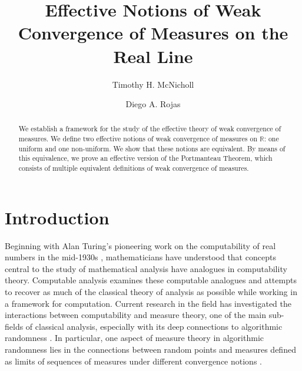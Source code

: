 \documentclass{amsart}
\newcommand{\R}{\mathbb{R}}
\theoremstyle{definition}
\numberwithin{equation}{section}
\begin{document}
\title{Effective Notions of Weak Convergence of Measures on the Real Line}
\author{Timothy H. McNicholl}
\address{Department of Mathematics\\
Iowa State University\\
Ames, Iowa 50011}
\author{Diego A. Rojas}%
\address{Department of Mathematics\\
Iowa State University\\
Ames, Iowa 50011}

\begin{abstract}
We establish a framework for the study of the effective theory of weak convergence of measures.  
We define two effective notions of weak convergence of measures on $\R$: one uniform and one non-uniform. 
We show that these notions are equivalent.   By means of this equivalence, we prove an effective version of the Portmanteau Theorem, which consists of multiple equivalent definitions of weak convergence of measures.
\end{abstract}

\maketitle

\section{Introduction}\label{sec:intro}

Beginning with Alan Turing's pioneering work on the computability of real numbers in the mid-1930s \cite{T37}, mathematicians have understood that concepts central to the study of mathematical analysis have analogues in computability theory. 
Computable analysis examines these computable analogues and attempts to recover as much of the classical theory of analysis as possible while working in a framework for computation. 
Current research in the field has investigated the interactions between computability and measure theory, one of the main sub-fields of classical analysis, especially with its deep connections to algorithmic randomness \cite{R16, R18}. 
In particular, one aspect of measure theory in algorithmic randomness lies in the connections between random points and measures defined as limits of sequences of measures under different convergence notions \cite{CL18, H11}.
\end{document}
